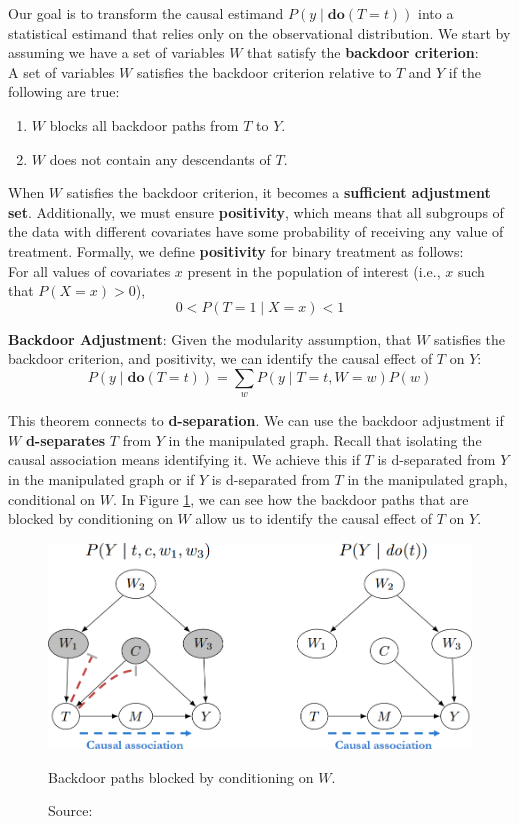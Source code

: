 Our goal is to transform the causal estimand
\( P(y \mid \textbf{do}(T = t)) \) into a statistical estimand
that relies only on the observational distribution.
We start by assuming we have a set of variables \( W \) that satisfy
the \textbf{backdoor criterion}:\\
A set of variables \( W \) satisfies the backdoor criterion relative to \( T \) and \( Y \) if the following are true:
\begin{enumerate}
    \item \( W \) blocks all backdoor paths from \( T \) to \( Y \).
    \item \( W \) does not contain any descendants of \( T \).
\end{enumerate}

When \( W \) satisfies the backdoor criterion,
it becomes a \textbf{sufficient adjustment set}.
Additionally, we must ensure \textbf{positivity},
which means that all subgroups of the data with different
covariates have some probability of receiving any value of treatment.
Formally, we define \textbf{positivity} for binary treatment as follows:\\
For all values of covariates \( x \) present in the population of
interest (i.e., \( x \) such that \( P(X = x) > 0 \)),
\[
0 < P(T = 1 \mid X = x) < 1
\]

\textbf{Backdoor Adjustment}: Given the modularity assumption,
that \( W \) satisfies the backdoor criterion, and positivity, 
we can identify the causal effect of \( T \) on \( Y \):
\begin{equation}
P(y \mid \textbf{do}(T = t)) = \sum_{w} P(y \mid T = t, W = w) P(w)
\end{equation}

This theorem connects to \textbf{d-separation}.
We can use the backdoor adjustment if \( W \)
\textbf{d-separates} \( T \) from \( Y \) in the manipulated graph.
Recall that isolating the causal association means
identifying it. We achieve this if \( T \) is d-separated from
\( Y \) in the manipulated graph or if \( Y \)
is d-separated from \( T \) in the manipulated graph,
conditional on \( W \).
In Figure \ref{fig:backdoor}, we can see how the backdoor paths
that are blocked by conditioning on \( W \) allow
us to identify the causal effect of \( T \) on \( Y \).

\begin{figure}[H]
    \centering
    \includegraphics[width=.75\textwidth]{figures/ch3/22.backdoor.png}
    \caption{Backdoor paths blocked by conditioning on \( W \).}
    \vspace{-10px}
    \caption*{\scriptsize{Source: \cite{Neal_2020a}}}
    \label{fig:backdoor}
\end{figure}

